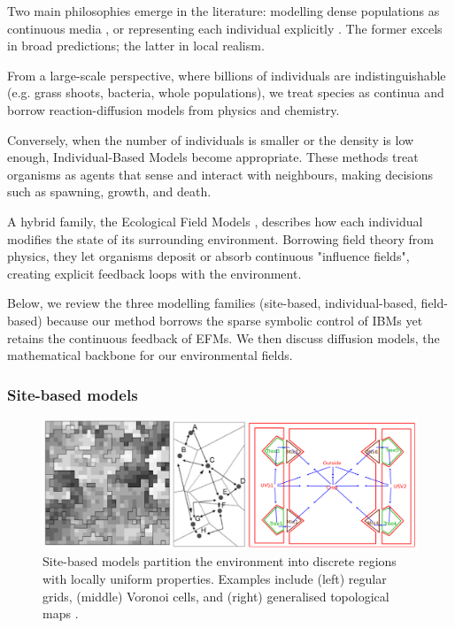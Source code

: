 Two main philosophies emerge in the literature: modelling dense populations as continuous media \cite{Turing1952}, or representing each individual explicitly \cite{Czaran1998}. The former excels in broad predictions; the latter in local realism.

From a large-scale perspective, where billions of individuals are indistinguishable (e.g. grass shoots, bacteria, whole populations), we treat species as continua and borrow reaction-diffusion models from physics and chemistry.

Conversely, when the number of individuals is smaller or the density is low enough, Individual-Based Models become appropriate. These methods treat organisms as agents that sense and interact with neighbours, making decisions such as spawning, growth, and death.

A hybrid family, the Ecological Field Models \cite{Wu1985}, describes how each individual modifies the state of its surrounding environment. Borrowing field theory from physics, they let organisms deposit or absorb continuous "influence fields", creating explicit feedback loops with the environment.

Below, we review the three modelling families (site-based, individual-based, field-based) because our method borrows the sparse symbolic control of IBMs yet retains the continuous feedback of EFMs. We then discuss diffusion models, the mathematical backbone for our environmental fields.

\subsubsection{Site-based models}

\begin{figure}[H]
\centering
\includegraphics[width=.8\linewidth]{grid-based-modeling-teaser.png}
\caption{Site-based models partition the environment into discrete regions with locally uniform properties. Examples include (left) regular grids, (middle) Voronoi cells, and (right) generalised topological maps \cite{Nelson2012,Lemiere2023}.}
\label{fig:env-obj-grid-based-models}
\end{figure}

